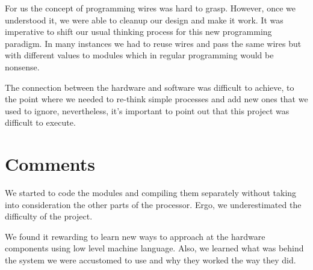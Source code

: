 \documentclass[conference]{IEEEtran}
\begin{document}
For us the concept of programming wires was hard to grasp. However, once we understood it, we were able to cleanup our design and make it work. It was imperative to shift our usual thinking process for this new programming paradigm. In many instances we had to reuse wires and pass the same wires but with different values to modules which in regular programming would be nonsense.

The connection between the hardware and software was difficult to achieve, to the point where we needed to re-think simple processes and add new ones that we used to ignore, nevertheless, it's important to point out that this project was difficult to execute.

\section{Comments}
    We started to code the modules and compiling them separately without taking into consideration the other parts of the processor. Ergo, we underestimated the difficulty of the project.  
    
    We found it rewarding to learn new ways to approach at the hardware components using low level machine language. Also, we learned what was behind the system we were accustomed to use and why they worked the way they did.
    
    




\cite{1}
\cite{10.2307/29774812}
\cite{8326740}
\cite{unknown}
\end{document}
